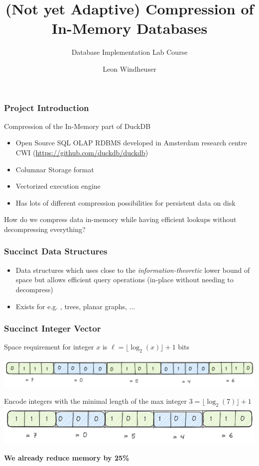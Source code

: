 \documentclass{beamer}
\title{(Not yet Adaptive) Compression of In-Memory Databases}
\subtitle{Database Implementation Lab Course}
\author{Leon Windheuser}
\begin{document}
\frame{\titlepage}


\begin{frame}
    \frametitle{Project Introduction}
    Compression of the In-Memory part of DuckDB
    \pause

    \begin{itemize}
        \item Open Source SQL OLAP RDBMS developed in Amsterdam research centre CWI
        (\url{https://github.com/duckdb/duckdb})
        \item Columnar Storage format
        \item Vectorized execution engine
        \item Has lots of different compression possibilities for persistent data on disk 
    \end{itemize}

    \vspace{1cm}
    \pause
    How do we compress data in-memory while having efficient lookups without decompressing everything?
\end{frame}


\begin{frame}
    \frametitle{Succinct Data Structures}
    
    \begin{itemize}
        \item Data structures which uses close to the \textit{information-theoretic} lower bound of space but 
    allows efficient query operations (in-place without needing to decompress)
        \item Exists for e.g. {}, trees, planar graphs, ...
    \end{itemize}
\end{frame}


\begin{frame}
    \frametitle{Succinct Integer Vector}
    \centering
    Space requirement for integer $x$ is $\ell = \lfloor \log_2(x) \rfloor + 1$ bits

    \includegraphics[width=\framewidth]{figures/excalidraw/bit-int-vector.png}
    \pause

    Encode integers with the minimal length of the max integer $3 = \lfloor \log_2(7) \rfloor + 1$ \\
    \vspace{0.5cm} 
    \includegraphics[width=0.75\framewidth]{figures/excalidraw/bit-compressed-int-vector.png}

    \vspace{0.5cm}
    \textbf{We already reduce memory by 25\%}
\end{frame}
\end{document}
